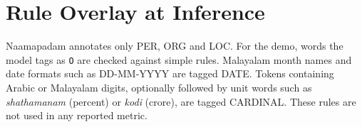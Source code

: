 \section{Rule Overlay at Inference}

Naamapadam annotates only PER, ORG and LOC. For the demo, words the model
tags as \texttt{O} are checked against simple rules. Malayalam month names
and date formats such as DD-MM-YYYY are tagged DATE. Tokens containing
Arabic or Malayalam digits, optionally followed by unit words such as
\emph{shathamanam} (percent) or \emph{kodi} (crore), are tagged CARDINAL.
These rules are not used in any reported metric.
